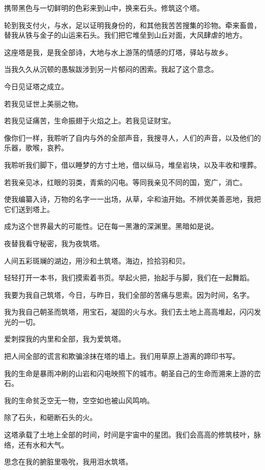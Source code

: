 \documentclass[UTF8]{article}
\begin{document}
\par 携带黑色与一切鲜明的色彩来到山中，换来石头。修筑这个塔。
\par 轮到我支付火，与水，足以证明我身份的，和其他我苦苦搜集的珍物。牵来畜兽，替我从铁与金子的山运来石头。我们把它堆垒到山丘对面，大风肆虐的地方。
\par 这座塔是我，是我全部诗，大地与水上游荡的情感的灯塔，驿站与故乡。
\par 当我久久从沉顿的愚騃跋涉到另一片郁闷的困索。我起了这个意念。
\par 今日见证塔之成立。
\\[0.6cm]
\par 若我见证世上美丽之物。
\par 若我见证痛苦，生命振翅于火焰之上。若我见证财宝。
\par 像你们一样，我聆听了自内与外的全部声音，我搜寻人，人们的声音，以及他们的乐器，歌喉，哀矜。
\par 我聆听我们脚下，借以睡梦的方寸土地，借以纵马，堆垒岩块，以及丰收和埋葬。
\par 若我亲见冰，红眼的羽类，青紫的闪电。等同我亲见不同的国，宽广，消亡。
\par 使我编纂入诗，万物的名字一一出场，从草，伞和油开始。不辨优美善恶地，我把它们送到塔上。
\par 成为这个世界最大的可能性。记在每一黑澈的深渊里。黑暗如是说。
\par 夜替我看守秘密，我为夜筑塔。
\par 人间五彩斑斓的湖边，用沙和土筑塔。海边，捡拾羽和贝。
\par 轻轻打开一本书，我们摸索着书页。举起火把，抬起手与脚，我们在一起舞蹈。
\par 我要为我自己筑塔，今日，与昨日，我们全部的苦痛与思索。因为时间，名字。
\par 我为我自己朝圣而筑塔，用宝石，凝固的火与水。我们去土地上高高堆起，闪闪发光的一切。
\par 爱刺探我的内里和全部，我为爱筑塔。
\par 把人间全部的谎言和欺骗涂抹在塔的墙上。我们用草原上游离的蹄印书写。
\par 我的生命是暴雨冲刷的山岩和闪电映照下的城市。朝圣自己的生命而溯来上游的峦石。
\par 我的生命贫乏空无一物，空空如也被山风鸣响。
\par 除了石头，和砸断石头的火。
\par 这塔承载了土地上全部的时间，时间是宇宙中的星团。我们会高高的修筑枝叶，脉络，还有水和大气。
\par 思念在我的腑脏里吸吮，我用泪水筑塔。
\end{document}
